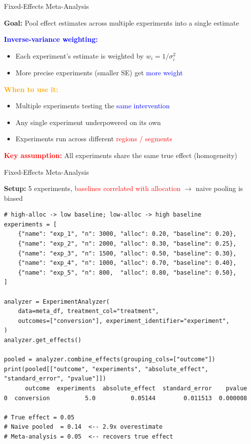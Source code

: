 \documentclass{beamer}
\newcommand{\blue}[1]{\textcolor{blue}{#1}}
\newcommand{\red}[1]{\textcolor{red}{#1}}
\newcommand{\orange}[1]{\textcolor{orange}{#1}}
\begin{document}
\begin{frame}{Fixed-Effects Meta-Analysis }

\textbf{Goal:} Pool effect estimates across multiple experiments into a single estimate

\textbf{\blue{Inverse-variance weighting:}}
\begin{itemize}
    \item Each experiment's estimate is weighted by $w_i = 1/\sigma_i^2$
    \item More precise experiments (smaller SE) get \blue{more weight}
\end{itemize}

\textbf{\orange{When to use it:}}
\begin{itemize}
    \item Multiple experiments testing the \blue{same intervention}
    \item Any single experiment underpowered on its own
    \item Experiments run across different \red{regions / segments}
\end{itemize}

\textbf{\red{Key assumption:}} All experiments share the same true effect (homogeneity)

\end{frame}


\begin{frame}[fragile]{Fixed-Effects Meta-Analysis }

\textbf{Setup:} 5 experiments, \red{baselines correlated with allocation} $\rightarrow$ naive pooling is biased

\begin{verbatim}
# high-alloc -> low baseline; low-alloc -> high baseline
experiments = [
    {"name": "exp_1", "n": 3000, "alloc": 0.20, "baseline": 0.20},
    {"name": "exp_2", "n": 2000, "alloc": 0.30, "baseline": 0.25},
    {"name": "exp_3", "n": 1500, "alloc": 0.50, "baseline": 0.30},
    {"name": "exp_4", "n": 1000, "alloc": 0.70, "baseline": 0.40},
    {"name": "exp_5", "n": 800,  "alloc": 0.80, "baseline": 0.50},
]

analyzer = ExperimentAnalyzer(
    data=meta_df, treatment_col="treatment",
    outcomes=["conversion"], experiment_identifier="experiment",
)
analyzer.get_effects()

pooled = analyzer.combine_effects(grouping_cols=["outcome"])
print(pooled[["outcome", "experiments", "absolute_effect", "standard_error", "pvalue"]])
      outcome  experiments  absolute_effect  standard_error    pvalue
0  conversion          5.0          0.05144        0.011513  0.000008

# True effect = 0.05
# Naive pooled  = 0.14  <-- 2.9x overestimate
# Meta-analysis = 0.05  <-- recovers true effect
\end{verbatim}

\end{frame}
\end{document}
